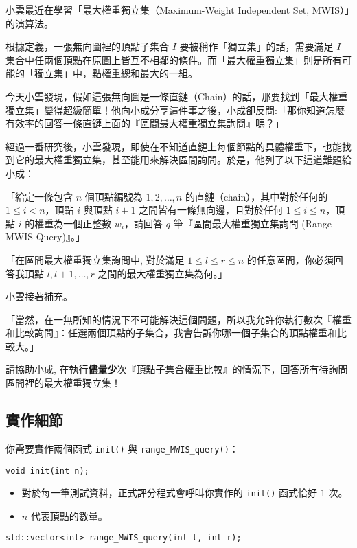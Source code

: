 小雲最近在學習「最大權重獨立集（Maximum-Weight Independent Set,
MWIS）」的演算法。

根據定義，一張無向圖裡的頂點子集合 \(I\)
要被稱作「獨立集」的話，需要滿足 \(I\)
集合中任兩個頂點在原圖上皆互不相鄰的條件。而「最大權重獨立集」則是所有可能的「獨立集」中，點權重總和最大的一組。

今天小雲發現，假如這張無向圖是一條直鏈（Chain）的話，那要找到「最大權重獨立集」變得超級簡單！他向小成分享這件事之後，小成卻反問:「那你知道怎麼有效率的回答一條直鏈上面的『區間最大權重獨立集詢問』嗎？」

經過一番研究後，小雲發現，即使在不知道直鏈上每個節點的具體權重下，也能找到它的最大權重獨立集，甚至能用來解決區間詢問。於是，他列了以下這道難題給小成：

「給定一條包含 \(n\) 個頂點編號為 \(1, 2, \ldots, n\)
的直鏈（chain），其中對於任何的 \(1 \leq i < n\)，頂點 \(i\) 與頂點
\(i+1\) 之間皆有一條無向邊，且對於任何 \(1 \leq i \leq n\)，頂點 \(i\)
的權重為一個正整數 \(w_i\)，請回答 \(q\) 筆『區間最大權重獨立集詢問
(Range MWIS Query)』。」

「在區間最大權重獨立集詢問中, 對於滿足 \(1 \leq l \leq r \leq n\)
的任意區間，你必須回答我頂點 \(l, l + 1, \ldots, r\)
之間的最大權重獨立集為何。」

小雲接著補充。

「當然，在一無所知的情況下不可能解決這個問題，所以我允許你執行數次『權重和比較詢問』：任選兩個頂點的子集合，我會告訴你哪一個子集合的頂點權重和比較大。」

請協助小成,
在執行\textbf{儘量少}次『頂點子集合權重比較』的情況下，回答所有待詢問區間裡的最大權重獨立集！

\subsection{實作細節}

你需要實作兩個函式 \texttt{init()} 與 \texttt{range\_MWIS\_query()}：

\begin{verbatim}
void init(int n);
\end{verbatim}

\begin{itemize}
\tightlist
\item
  對於每一筆測試資料，正式評分程式會呼叫你實作的 \texttt{init()}
  函式恰好 \(1\) 次。
\item
  \(n\) 代表頂點的數量。
\end{itemize}

\begin{verbatim}
std::vector<int> range_MWIS_query(int l, int r);
\end{verbatim}

